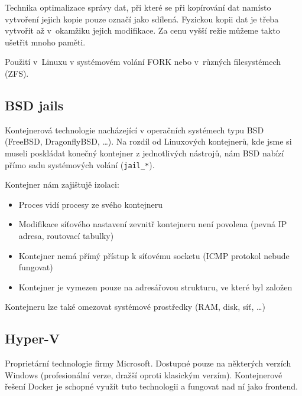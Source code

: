 Technika optimalizace správy dat, při které se při kopírování dat namísto vytvoření jejich kopie pouze označí jako sdílená.
Fyzickou kopii dat je třeba vytvořit až v~okamžiku jejich modifikace.
Za cenu vyšší režie můžeme takto ušetřit mnoho paměti.


Použití v~Linuxu v systémovém volání FORK nebo v~různých filesystémech (ZFS).

\subsection{BSD jails}

Kontejnerová technologie nacházející v operačních systémech typu BSD (FreeBSD, DragonflyBSD, \ldots).
Na rozdíl od Linuxových kontejnerů, kde jsme si museli poskládat konečný kontejner z jednotlivých nástrojů, nám BSD nabízí přímo sadu systémových volání (\verb|jail_*|).

Kontejner nám zajištujě izolaci:
\begin{itemize}
	\item Proces vidí procesy ze svého kontejneru
	\item Modifikace síťového nastavení zevnitř kontejneru není povolena (pevná IP adresa, routovací tabulky)
	\item Kontejner nemá přímý přístup k síťovému socketu (ICMP protokol nebude fungovat)
	\item Kontejner je vymezen pouze na adresářovou strukturu, ve které byl založen
\end{itemize}

Kontejneru lze také omezovat systémové prostředky (RAM, disk, síť, \ldots)



\subsection{Hyper-V}

Proprietární technologie firmy Microsoft.
Dostupné pouze na některých verzích Windows (profesionální verze, dražší oproti klasickým verzím).
Kontejnerové řešení Docker je schopné využít tuto technologii a fungovat nad ní jako frontend.

